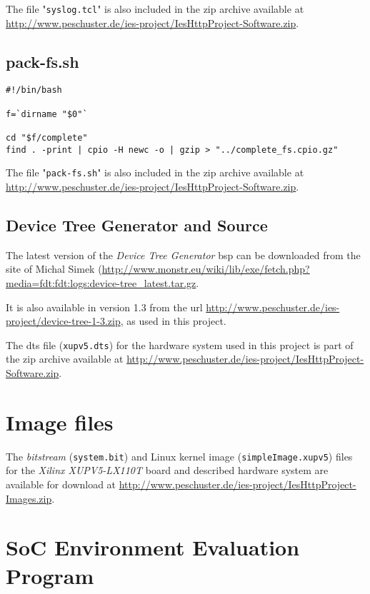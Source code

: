 The file "\texttt{syslog.tcl}" is also included in the zip archive available at \url{http://www.peschuster.de/ies-project/IesHttpProject-Software.zip}.
\\

\subsection{pack-fs.sh}
\label{subsec:pack-fs}

\begin{verbatim}
#!/bin/bash

f=`dirname "$0"`

cd "$f/complete"
find . -print | cpio -H newc -o | gzip > "../complete_fs.cpio.gz"
\end{verbatim}

The file "\texttt{pack-fs.sh}" is also included in the zip archive available at \url{http://www.peschuster.de/ies-project/IesHttpProject-Software.zip}.
\\

\subsection{Device Tree Generator and Source}
\label{subsec:dts-generator}

The latest version of the \textit{Device Tree Generator} \gls{bsp} can be downloaded from the site of Michal Simek (\url{http://www.monstr.eu/wiki/lib/exe/fetch.php?media=fdt:fdt:logs:device-tree_latest.tar.gz}.

It is also available in version 1.3 from the url \url{http://www.peschuster.de/ies-project/device-tree-1-3.zip}, as used in this project.

The dts file (\texttt{xupv5.dts}) for the hardware system used in this project is part of the zip archive available at \url{http://www.peschuster.de/ies-project/IesHttpProject-Software.zip}.
\\

\section{Image files}

The \textit{bitstream} (\texttt{system.bit}) and Linux kernel image (\texttt{simpleImage.xupv5}) files for the \textit{Xilinx XUPV5-LX110T} board and described hardware system are available for download at \url{http://www.peschuster.de/ies-project/IesHttpProject-Images.zip}.


\section{SoC Environment Evaluation Program}
\label{sec:nginx-env-eval}

